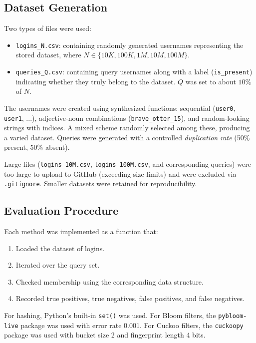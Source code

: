 \documentclass[acmsmall]{acmart}
\begin{document}
\subsection{Dataset Generation}
Two types of files were used:  
\begin{itemize}
  \item \texttt{logins\_N.csv}: containing randomly generated usernames representing the stored dataset, where $N \in \{10K, 100K, 1M, 10M, 100M\}$.  
  \item \texttt{queries\_Q.csv}: containing query usernames along with a label (\texttt{is\_present}) indicating whether they truly belong to the dataset. $Q$ was set to about $10\%$ of $N$.  
\end{itemize}

The usernames were created using synthesized functions: sequential (\texttt{user0}, \texttt{user1}, ...), adjective-noun combinations (\texttt{brave\_otter\_15}), and random-looking strings with indices. A mixed scheme randomly selected among these, producing a varied dataset. Queries were generated with a controlled \emph{duplication rate} (50\% present, 50\% absent).  

Large files (\texttt{logins\_10M.csv}, \texttt{logins\_100M.csv}, and corresponding queries) were too large to upload to GitHub (exceeding size limits) and were excluded via \texttt{.gitignore}. Smaller datasets were retained for reproducibility.  

\subsection{Evaluation Procedure}
Each method was implemented as a function that:  
\begin{enumerate}
  \item Loaded the dataset of logins.  
  \item Iterated over the query set.  
  \item Checked membership using the corresponding data structure.  
  \item Recorded true positives, true negatives, false positives, and false negatives.  
\end{enumerate}

For hashing, Python’s built-in \texttt{set()} was used. For Bloom filters, the \texttt{pybloom-live} package was used with error rate 0.001. For Cuckoo filters, the \texttt{cuckoopy} package was used with bucket size 2 and fingerprint length 4 bits.  
\end{document}

